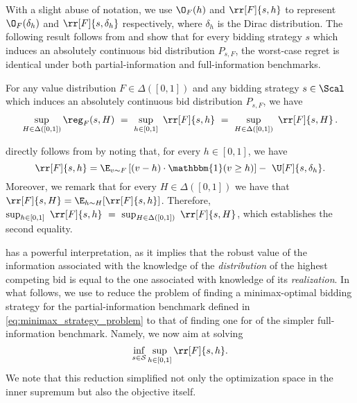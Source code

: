 With a slight abuse of notation, we use $\O_F(h)$ and $\rr[F]{s,h}$ to represent $\O_F(\delta_h)$ and $\rr[F]{s,\delta_h}$ respectively, where $\delta_h$ is the Dirac distribution. The following result follows from  and show that for every bidding strategy $s$ which induces an absolutely continuous bid distribution $P_{s,F}$, the worst-case regret is identical under both partial-information and full-information benchmarks. %
\begin{corollary}\label{thm:full-info}
	For any value distribution $F \in \Delta([0,1])$ and any bidding strategy $s \in \Scal$ which induces an absolutely continuous bid distribution $P_{s,F}$, we have
	\begin{align*}
		\sup_{H \in \Delta([0,1])} \reg_F(s,H)\ =\ \sup_{h \in [0,1]}\ \rr[F]{s, h}\ =\ \sup_{H \in \Delta([0,1])}\ \rr[F]{s, H}\,.
	\end{align*}
\end{corollary}
 directly follows from  by noting that, for every $h \in [0,1]$, we have 
\begin{equation*}
    \rr[F]{s,h} = \E_{v \sim F}\left[ (v-h) \cdot \mathbbm{1}(v \geq h) \right]-\ \U[F]{s,\delta_h}.
\end{equation*}
Moreover, we remark that for every $H \in \Delta([0,1])$ we have that $\rr[F]{s,H} = \E_{h \sim H}[\rr[F]{s,h}]$. Therefore, $\sup_{h \in [0,1]}\ \rr[F]{s, h}\ =\ \sup_{H \in \Delta([0,1])}\ \rr[F]{s, H}$, which establishes the second equality.

 has a powerful interpretation, as it implies that the robust value of the information associated with the knowledge of the \emph{distribution} of the highest competing bid is equal to the one associated with knowledge of its \emph{realization}.
In what follows, we use  to reduce the problem of finding a minimax-optimal bidding strategy for the partial-information benchmark defined in \eqref{eq:minimax_strategy_problem} to that of finding one for of the simpler full-information benchmark. Namely, we now aim at solving
\begin{equation}
    \label{eq:minimax_full_info}
    \inf_{s \in \mathcal{S}} \sup_{h \in [0,1]} \rr[F]{s,h}.
\end{equation}
We note that this reduction simplified not only the optimization space in the inner supremum but also the objective itself. 

